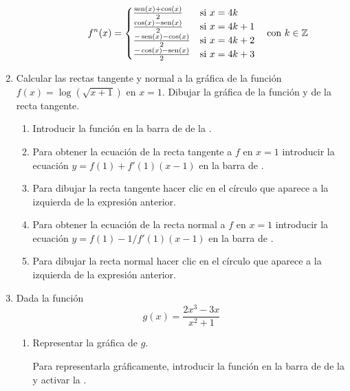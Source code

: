 \begin{enumerate}[leftmargin=*]
\begin{enumerate}
\begin{indication}
\begin{enumerate}
                  \[
                  f^n(x)=
                  \begin{cases}
                  \frac{\operatorname{sen}(x)+\cos(x)}{2}  & \mbox{si $x=4k$}   \\
                  \frac{\cos(x)-\operatorname{sen}(x)}{2}  & \mbox{si $x=4k+1$} \\
                  \frac{-\operatorname{sen}(x)-\cos(x)}{2} & \mbox{si $x=4k+2$} \\
                  \frac{-\cos(x)-\operatorname{sen}(x)}{2} & \mbox{si $x=4k+3$} \\
                  \end{cases}
                  \quad \mbox{con $k\in \mathbb{Z}$}
                  \]
            \end{enumerate}
            \end{indication}
      \end{enumerate}

\item Calcular las rectas tangente y normal a la gráfica de la función $f(x)=\log(\sqrt{x+1})$ en $x=1$.
      Dibujar la gráfica de la función y de la recta tangente.
      \begin{indication}
      \begin{enumerate}
      \item Introducir la función  en la barra de  de la .
      \item Para obtener la ecuación de la recta tangente a $f$ en $x=1$ introducir la ecuación $y=f(1)+f'(1)(x-1)$ en la barra de .
      \item Para dibujar la recta tangente hacer clic en el círculo que aparece a la izquierda de la expresión anterior.
      \item Para obtener la ecuación de la recta normal a $f$ en $x=1$ introducir la ecuación $y=f(1)-1/f'(1)(x-1)$ en la barra de .
      \item Para dibujar la recta normal hacer clic en el círculo que aparece a la izquierda de la expresión anterior.
      \end{enumerate}
      \end{indication}



\item Dada la función
      \[
      g(x)=\dfrac{2x^{3}-3x}{x^{2}+1}
      \]

      \begin{enumerate}
      \item Representar la gráfica de $g$.
            \begin{indication}
            Para representarla gráficamente, introducir la función  en la barra de  de la  y activar la .
            \end{indication}


\end{enumerate}
\end{enumerate}
